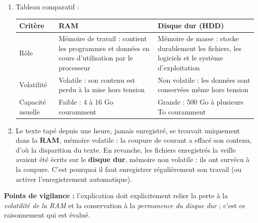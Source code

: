 \documentclass[11pt]{article}
\begin{document}
\begin{corrige}
\begin{enumerate}
\item Tableau comparatif :
\begin{center}
\begin{tabularx}{\linewidth}{|l|X|X|}
\hline
\rowcolor{popblueL} \textbf{Critère} & \textbf{RAM} & \textbf{Disque dur (HDD)} \\
\hline
Rôle & Mémoire de travail : contient les programmes et données en cours d'utilisation par le processeur & Mémoire de masse : stocke durablement les fichiers, les logiciels et le système d'exploitation \\
\hline
Volatilité & Volatile : son contenu est perdu à la mise hors tension & Non volatile : les données sont conservées même hors tension \\
\hline
Capacité usuelle & Faible : 4 à 16 Go couramment & Grande : 500 Go à plusieurs To couramment \\
\hline
\end{tabularx}
\end{center}
\item Le texte tapé depuis une heure, jamais enregistré, se trouvait uniquement dans la \textbf{RAM}, mémoire volatile : la coupure de courant a effacé son contenu, d'où la disparition du texte. En revanche, les fichiers enregistrés la veille avaient été écrits sur le \textbf{disque dur}, mémoire non volatile : ils ont survécu à la coupure. C'est pourquoi il faut enregistrer régulièrement son travail (ou activer l'enregistrement automatique).
\end{enumerate}
\textbf{Points de vigilance :} l'explication doit explicitement relier la perte à la \emph{volatilité de la RAM} et la conservation à la \emph{permanence du disque dur} ; c'est ce raisonnement qui est évalué.
\end{corrige}
\end{document}
